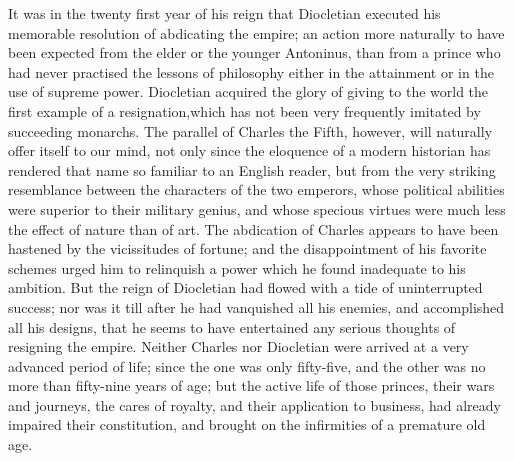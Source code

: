 It was in the twenty first year of his reign that Diocletian
executed his memorable resolution of abdicating the empire; an
action more naturally to have been expected from the elder or the
younger Antoninus, than from a prince who had never practised the
lessons of philosophy either in the attainment or in the use of
supreme power. Diocletian acquired the glory of giving to the
world the first example of a resignation,\footnotemark[106] which has not been
very frequently imitated by succeeding monarchs. The parallel of
Charles the Fifth, however, will naturally offer itself to our
mind, not only since the eloquence of a modern historian has
rendered that name so familiar to an English reader, but from the
very striking resemblance between the characters of the two
emperors, whose political abilities were superior to their
military genius, and whose specious virtues were much less the
effect of nature than of art. The abdication of Charles appears
to have been hastened by the vicissitudes of fortune; and the
disappointment of his favorite schemes urged him to relinquish a
power which he found inadequate to his ambition. But the reign of
Diocletian had flowed with a tide of uninterrupted success; nor
was it till after he had vanquished all his enemies, and
accomplished all his designs, that he seems to have entertained
any serious thoughts of resigning the empire. Neither Charles nor
Diocletian were arrived at a very advanced period of life; since
the one was only fifty-five, and the other was no more than
fifty-nine years of age; but the active life of those princes,
their wars and journeys, the cares of royalty, and their
application to business, had already impaired their constitution,
and brought on the infirmities of a premature old age.\footnotemark[107]



